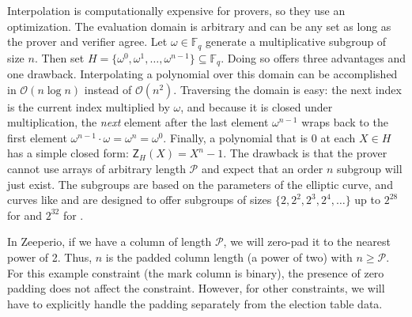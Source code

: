 Interpolation is computationally expensive for provers, so they use an optimization. 
The evaluation domain is arbitrary and can be any set as long as the prover and verifier agree. 
Let $\omega\in\mathbb{F}_q$ generate a multiplicative subgroup of size $n$. 
Then set $H=\{\omega^0,\omega^1,\dots,\omega^{n-1}\}\subseteq \mathbb{F}_q$. 
Doing so offers three advantages and one drawback. 
Interpolating a polynomial over this domain can be accomplished in $\mathcal{O}(n \log n)$ instead of $\mathcal{O}(n^2)$. 
Traversing the domain is easy: the next index is the current index multiplied by $\omega$, and because it is closed under multiplication, the \emph{next} element after the last element $\omega^{n-1}$ wraps back to the first element $\omega^{n-1}\cdot\omega=\omega^{n}=\omega^{0}$. 
Finally, a polynomial that is 0 at each $X\in H$ has a simple closed form: $\mathsf{Z}_H(X)=X^n-1$. 
The drawback is that the prover cannot use arrays of arbitrary length $\mathcal{P}$ and expect that an order $n$ subgroup will just exist. 
The subgroups are based on the parameters of the elliptic curve, and curves like \altbn and \bls are designed to offer subgroups of sizes $\{2,2^2,2^3,2^4,\ldots\}$ up to $2^{28}$ for \altbn and $2^{32}$ for \bls.

In Zeeperio, if we have a column of length $\mathcal{P}$, we will zero-pad it to the nearest power of 2. 
Thus, $n$ is the padded column length (a power of two) with $n\ge \mathcal{P}$. 
For this example constraint (the mark column is binary), the presence of zero padding does not affect the constraint. 
However, for other constraints, we will have to explicitly handle the padding separately from the election table data. 

